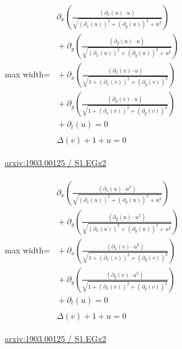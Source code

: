 \documentclass[10pt,a4paper]{article}
\begin{document}
\begin{minipage}{\linewidth}
\begin{center}\begin{adjustbox}{max width=\linewidth}$\displaystyle\begin{gathered}\begin{gathered}\partial_{x}(\frac{(\partial_{x}(u)\cdot u)}{\sqrt{(\partial_{x}(u))^{2}+(\partial_{y}(u))^{2}+u^{2}}})\\[-1pt]{}+\partial_{y}(\frac{(\partial_{y}(u)\cdot u)}{\sqrt{(\partial_{x}(u))^{2}+(\partial_{y}(u))^{2}+u^{2}}})\\[-1pt]{}+\partial_{x}(\frac{(\partial_{x}(v)\cdot u)}{\sqrt{1+(\partial_{x}(v))^{2}+(\partial_{y}(v))^{2}}})\\[-1pt]{}+\partial_{y}(\frac{(\partial_{y}(v)\cdot u)}{\sqrt{1+(\partial_{x}(v))^{2}+(\partial_{y}(v))^{2}}})\\[-1pt]{}+\partial_{t}(u)=0\end{gathered}\\[5pt]\begin{gathered}\Delta(v)+1+u=0\end{gathered}\end{gathered}$\end{adjustbox}\end{center}
{\small \href{https://arxiv.org/html/1903.00125#S1.EGx2}{arxiv:1903.00125 / S1.EGx2}}\par
\end{minipage}\par\vspace{7mm}

\begin{minipage}{\linewidth}
\begin{center}\begin{adjustbox}{max width=\linewidth}$\displaystyle\begin{gathered}\begin{gathered}\partial_{x}(\frac{(\partial_{x}(u)\cdot u^{2})}{\sqrt{(\partial_{x}(u))^{2}+(\partial_{y}(u))^{2}+u^{2}}})\\[-1pt]{}+\partial_{y}(\frac{(\partial_{y}(u)\cdot u^{2})}{\sqrt{(\partial_{x}(u))^{2}+(\partial_{y}(u))^{2}+u^{2}}})\\[-1pt]{}+\partial_{x}(\frac{(\partial_{x}(v)\cdot u^{2})}{\sqrt{1+(\partial_{x}(v))^{2}+(\partial_{y}(v))^{2}}})\\[-1pt]{}+\partial_{y}(\frac{(\partial_{y}(v)\cdot u^{2})}{\sqrt{1+(\partial_{x}(v))^{2}+(\partial_{y}(v))^{2}}})\\[-1pt]{}+\partial_{t}(u)=0\end{gathered}\\[5pt]\begin{gathered}\Delta(v)+1+u=0\end{gathered}\end{gathered}$\end{adjustbox}\end{center}
{\small \href{https://arxiv.org/html/1903.00125#S1.EGx2}{arxiv:1903.00125 / S1.EGx2}}\par
\end{minipage}\par\vspace{7mm}
\end{document}
